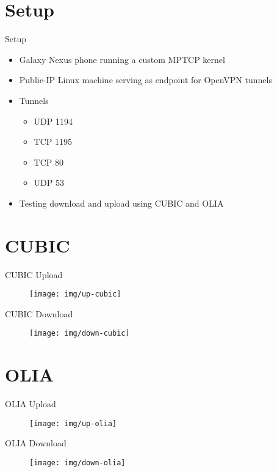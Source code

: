 \documentclass{beamer}
\begin{document}
\section{Setup}
\begin{frame}{Setup}
   \begin{itemize}
	\item Galaxy Nexus phone running a custom MPTCP kernel
           \item Public-IP Linux machine serving as endpoint for OpenVPN tunnels
           \item Tunnels
	\begin{itemize}
		\item UDP 1194
		\item TCP 1195
		\item TCP 80
		\item UDP 53
	\end{itemize}
    	\item Testing download and upload using CUBIC and OLIA
    \end{itemize}
\end{frame}

\section{CUBIC}
\begin{frame}{CUBIC Upload}
  \begin{figure}
    \texttt{[image: img/up-cubic]}
  \end{figure}
\end{frame}
\begin{frame}{CUBIC Download}
  \begin{figure}
    \texttt{[image: img/down-cubic]}
  \end{figure}
\end{frame}

\section{OLIA}
\begin{frame}{OLIA Upload}
  \begin{figure}
    \texttt{[image: img/up-olia]}
  \end{figure}
\end{frame}
\begin{frame}{OLIA Download}
  \begin{figure}
    \texttt{[image: img/down-olia]}
  \end{figure}
\end{frame}
\end{document}
